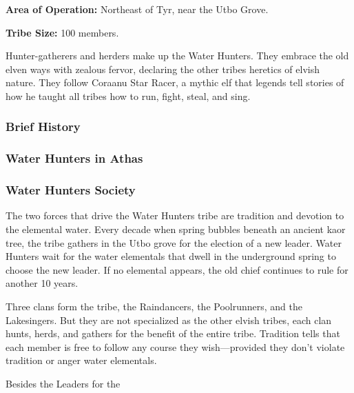 \textbf{Area of Operation:} Northeast of Tyr, near the Utbo Grove.

\textbf{Tribe Size:} 100 members.

Hunter-gatherers and herders make up the Water Hunters. They embrace the old elven ways with zealous fervor, declaring the other tribes heretics of elvish nature. They follow Coraanu Star Racer, a mythic elf that legends tell stories of how he taught all tribes how to run, fight, steal, and sing.

\subsubsection{Brief History}


\subsubsection{Water Hunters in Athas}

\subsubsection{Water Hunters Society}
The two forces that drive the Water Hunters tribe are tradition and devotion to the elemental water. Every decade when spring bubbles beneath an ancient kaor tree, the tribe gathers in the Utbo grove for the election of a new leader. Water Hunters wait for the water elementals that dwell in the underground spring to choose the new leader. If no elemental appears, the old chief continues to rule for another 10 years.

Three clans form the tribe, the Raindancers, the Poolrunners, and the Lakesingers. But they are not specialized as the other elvish tribes, each clan hunts, herds, and gathers for the  benefit of the entire tribe. Tradition tells that each member is free to follow any course they wish---provided they don't violate tradition or anger water elementals.

Besides the Leaders for the
